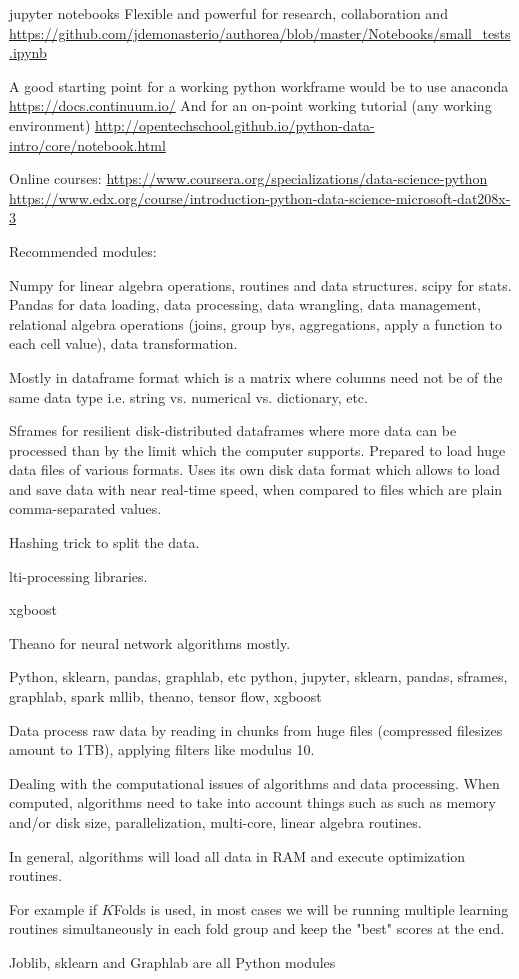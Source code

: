\documentclass{article}%
\theoremstyle{definition}
\begin{document}
jupyter notebooks
Flexible and powerful for research, collaboration and 
\url{https://github.com/jdemonasterio/authorea/blob/master/Notebooks/small_tests.ipynb}

A good starting point for a working python workframe would be to use anaconda 
\url{https://docs.continuum.io/}
And for an on-point working tutorial (any working environment)
\url{http://opentechschool.github.io/python-data-intro/core/notebook.html}



Online courses:
\url{https://www.coursera.org/specializations/data-science-python}
\url{https://www.edx.org/course/introduction-python-data-science-microsoft-dat208x-3} 




Recommended modules:

Numpy for linear algebra operations, routines and data structures.
scipy for stats.
Pandas for data loading, data processing, data wrangling, data management, relational algebra  operations (joins, group bys, aggregations, apply a function to each cell value), data transformation. 

Mostly in dataframe format which is a matrix where columns need not be of the same data type i.e. string vs. numerical vs. dictionary, etc.

Sframes for resilient disk-distributed dataframes where more data can be processed than by the limit which the computer supports. Prepared to load huge data files of various formats. Uses its own disk data format which allows to load and save data with near real-time speed, when compared to files which are plain comma-separated values.

Hashing trick to split the data.


lti-processing libraries.

xgboost

Theano for neural network algorithms mostly.


Python, sklearn, pandas, graphlab, etc
python, jupyter, sklearn, pandas, sframes, graphlab, spark mllib, theano, tensor flow, xgboost

Data process raw data by reading in chunks from huge files (compressed filesizes amount to 1TB), applying filters like modulus 10.

Dealing with the computational issues of algorithms and data processing. When computed, algorithms need to take into account things such as such as memory and/or disk size, parallelization, multi-core, linear algebra routines.

In general, algorithms will load all data in RAM and execute optimization routines. 

For example if $K$Folds is used, in most cases we will be running multiple  learning routines simultaneously in each fold group and keep the "best" scores at the end.

Joblib, sklearn and Graphlab are all Python modules
\end{document}
